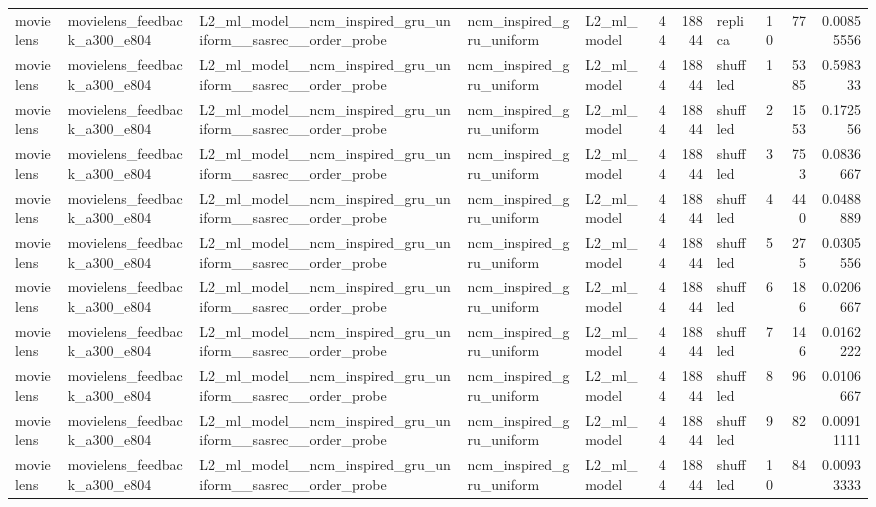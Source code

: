 \begin{table}[htbp!]
\begin{tabular}{lllllrrlrrr}
movielens & movielens\_feedback\_a300\_e804 & L2\_ml\_model\_\_ncm\_inspired\_gru\_uniform\_\_sasrec\_\_order\_probe & ncm\_inspired\_gru\_uniform & L2\_ml\_model & 44 & 18844 & replica & 10 & 77 & 0.00855556 \\
movielens & movielens\_feedback\_a300\_e804 & L2\_ml\_model\_\_ncm\_inspired\_gru\_uniform\_\_sasrec\_\_order\_probe & ncm\_inspired\_gru\_uniform & L2\_ml\_model & 44 & 18844 & shuffled & 1 & 5385 & 0.598333 \\
movielens & movielens\_feedback\_a300\_e804 & L2\_ml\_model\_\_ncm\_inspired\_gru\_uniform\_\_sasrec\_\_order\_probe & ncm\_inspired\_gru\_uniform & L2\_ml\_model & 44 & 18844 & shuffled & 2 & 1553 & 0.172556 \\
movielens & movielens\_feedback\_a300\_e804 & L2\_ml\_model\_\_ncm\_inspired\_gru\_uniform\_\_sasrec\_\_order\_probe & ncm\_inspired\_gru\_uniform & L2\_ml\_model & 44 & 18844 & shuffled & 3 & 753 & 0.0836667 \\
movielens & movielens\_feedback\_a300\_e804 & L2\_ml\_model\_\_ncm\_inspired\_gru\_uniform\_\_sasrec\_\_order\_probe & ncm\_inspired\_gru\_uniform & L2\_ml\_model & 44 & 18844 & shuffled & 4 & 440 & 0.0488889 \\
movielens & movielens\_feedback\_a300\_e804 & L2\_ml\_model\_\_ncm\_inspired\_gru\_uniform\_\_sasrec\_\_order\_probe & ncm\_inspired\_gru\_uniform & L2\_ml\_model & 44 & 18844 & shuffled & 5 & 275 & 0.0305556 \\
movielens & movielens\_feedback\_a300\_e804 & L2\_ml\_model\_\_ncm\_inspired\_gru\_uniform\_\_sasrec\_\_order\_probe & ncm\_inspired\_gru\_uniform & L2\_ml\_model & 44 & 18844 & shuffled & 6 & 186 & 0.0206667 \\
movielens & movielens\_feedback\_a300\_e804 & L2\_ml\_model\_\_ncm\_inspired\_gru\_uniform\_\_sasrec\_\_order\_probe & ncm\_inspired\_gru\_uniform & L2\_ml\_model & 44 & 18844 & shuffled & 7 & 146 & 0.0162222 \\
movielens & movielens\_feedback\_a300\_e804 & L2\_ml\_model\_\_ncm\_inspired\_gru\_uniform\_\_sasrec\_\_order\_probe & ncm\_inspired\_gru\_uniform & L2\_ml\_model & 44 & 18844 & shuffled & 8 & 96 & 0.0106667 \\
movielens & movielens\_feedback\_a300\_e804 & L2\_ml\_model\_\_ncm\_inspired\_gru\_uniform\_\_sasrec\_\_order\_probe & ncm\_inspired\_gru\_uniform & L2\_ml\_model & 44 & 18844 & shuffled & 9 & 82 & 0.00911111 \\
movielens & movielens\_feedback\_a300\_e804 & L2\_ml\_model\_\_ncm\_inspired\_gru\_uniform\_\_sasrec\_\_order\_probe & ncm\_inspired\_gru\_uniform & L2\_ml\_model & 44 & 18844 & shuffled & 10 & 84 & 0.00933333 \\

\end{tabular}
\end{table}
